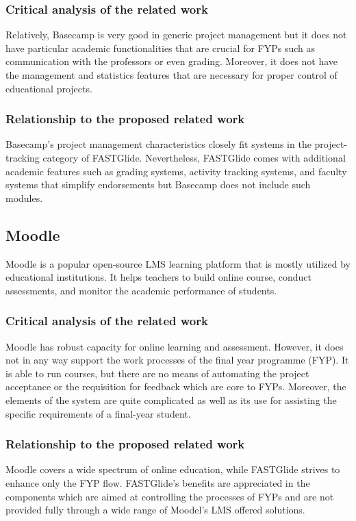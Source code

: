 \documentclass{FastFyp}
\begin{document}
\subsubsection{Critical analysis of the related work}
Relatively, Basecamp is very good in generic project management but it does not have particular academic functionalities that are crucial for FYPs such as communication with the professors or even grading. Moreover, it does not have the management and statistics features that are necessary for proper control of educational projects.
\subsubsection{Relationship to the proposed related work}
Basecamp’s project management characteristics closely fit systems in the project-tracking category of FASTGlide. Nevertheless, FASTGlide comes with additional academic features such as grading systems, activity tracking systems, and faculty systems that simplify endorsements but Basecamp does not include such modules.
\subsection{Moodle}
Moodle \cite{ref:moodle} is a popular open-source LMS learning platform that is mostly utilized by educational institutions. It helps teachers to build online course, conduct assessments, and monitor the academic performance of students.
\subsubsection{Critical analysis of the related work}
Moodle has robust capacity for online learning and assessment. However, it does not in any way support the work processes of the final year programme (FYP). It is able to run courses, but there are no means of automating the project acceptance or the requisition for feedback which are core to FYPs. Moreover, the elements of the system are quite complicated as well as its use for assisting the specific requirements of a final-year student.
\subsubsection{Relationship to the proposed related work}
Moodle covers a wide spectrum of online education, while FASTGlide strives to enhance only the FYP flow. FASTGlide’s benefits are appreciated in the components which are aimed at controlling the processes of FYPs and are not provided fully through a wide range of Moodel’s LMS offered solutions.
\end{document}
